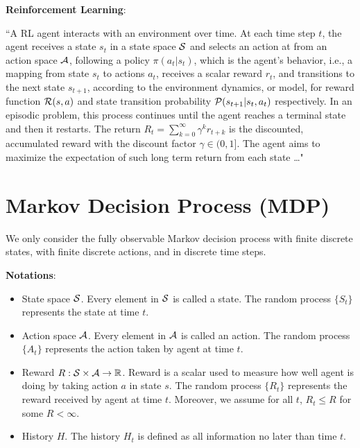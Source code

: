\newcommand{\calV}{\mathcal{V}}
\newcommand{\dpolicy}{\mathcal{D}^{\text{MD}}}
\newcommand{\rpolicy}{\mathcal{D}^{\text{MR}}}
\newcommand{\operator}{\mathscr{L}}

\textbf{Reinforcement Learning}:
\begin{displayquote}
``A RL agent interacts with an environment over time. At each time step $t$, the agent receives a state
$s_t$ in a state space $\mathcal{S}$ and selects an action at from an action space $\mathcal{A}$, following a policy $\pi(a_t|s_t)$,
which is the agent's behavior, i.e., a mapping from state $s_t$ to actions $a_t$, receives a scalar reward
$r_t$, and transitions to the next state $s_{t+1}$, according to the environment dynamics, or model, for
reward function $\mathcal{R}(s,a)$ and state transition probability $\mathcal{P}(s_{t+1}|s_t, a_t)$ respectively. In an episodic
problem, this process continues until the agent reaches a terminal state and then it restarts. The return
$R_t =\sum_{k=0}^\infty \gamma^k r_{t+k}$ is the discounted, accumulated reward with the discount factor $\gamma \in (0,1]$. The
agent aims to maximize the expectation of such long term return from each state \dots"
\end{displayquote} 
 
\section{Markov Decision Process (MDP)} 
We only consider the fully observable Markov decision process with finite discrete states, with finite discrete actions, and in discrete time steps.

\medspace

\textbf{Notations}:
\begin{itemize}
	\item State space $\mathcal{S}$. Every element in $\mathcal{S}$ is called a state. The random process $\{S_t\}$ represents the state at time $t$.
	
	\item Action space $\mathcal{A}$. Every element in $\mathcal{A}$ is called an action.  The random process $\{A_t\}$ represents the action taken by agent at time $t$.
	
	\item Reward $R: \mathcal{S}\times \mathcal{A}  \to \mathbb{R}$. Reward is a scalar used to measure how well agent is doing by taking action $a$ in state $s$. The random process $\{R_t\}$ represents the reward received by agent at time $t$. Moreover, we assume for all $t$, $R_t \leq R$ for some $R<\infty$.
	
	\item History $H$. The history $H_t$ is defined as all information no later than time $t$.  
\end{itemize}

